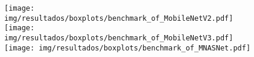 \begin{figure}[h!]
	\texttt{[image: img/resultados/boxplots/benchmark\_of\_MobileNetV2.pdf]}
	\texttt{[image: img/resultados/boxplots/benchmark\_of\_MobileNetV3.pdf]}
	\texttt{[image: img/resultados/boxplots/benchmark\_of\_MNASNet.pdf]}
	\caption{}
	\label{fig:Time_of_Mobile nets}
\end{figure}
